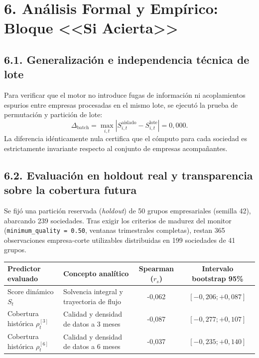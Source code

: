 \documentclass[10pt,a4paper]{article}
\begin{document}
\section*{6. Análisis Formal y Empírico: Bloque <<Si Acierta>>}

\subsection*{6.1. Generalización e independencia técnica de lote}
Para verificar que el motor no introduce fugas de información ni acoplamientos espurios entre empresas procesadas en el mismo lote, se ejecutó la prueba de permutación y partición de lote:
\[
\Delta_{\text{batch}} = \max_{i, t} |S_{i, t}^{\text{aislado}} - S_{i, t}^{\text{lote}}| = 0{,}000.
\]
La diferencia idénticamente nula certifica que el cómputo para cada sociedad es estrictamente invariante respecto al conjunto de empresas acompañantes.

\subsection*{6.2. Evaluación en holdout real y transparencia sobre la cobertura futura}
Se fijó una partición reservada (\emph{holdout}) de 50 grupos empresariales (semilla 42), abarcando 239 sociedades. Tras exigir los criterios de madurez del monitor (\texttt{minimum\_quality = 0.50}, ventanas trimestrales completas), restan 365 observaciones empresa-corte utilizables distribuidas en 199 sociedades de 41 grupos.

\begin{center}
\small
\begin{tabularx}{\textwidth}{lXcc}
\toprule
\textbf{Predictor evaluado} & \textbf{Concepto analítico} & \textbf{Spearman ($r_s$)} & \textbf{Intervalo bootstrap 95\%} \\
\midrule
Score dinámico $S_t$ & Solvencia integral y trayectoria de flujo & -0,062 & $[-0{,}206; +0{,}087]$ \\
Cobertura histórica $\rho_t^{[3]}$ & Calidad y densidad de datos a 3 meses & -0,087 & $[-0{,}277; +0{,}107]$ \\
Cobertura histórica $\rho_t^{[6]}$ & Calidad y densidad de datos a 6 meses & -0,037 & $[-0{,}235; +0{,}140]$ \\
\bottomrule
\end{tabularx}
\end{center}
\end{document}
